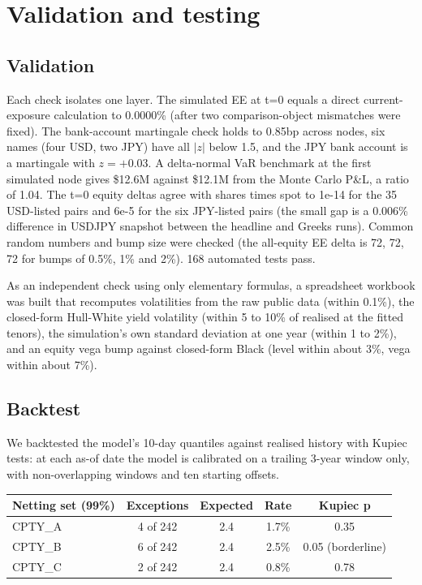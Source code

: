 \documentclass[11pt,letterpaper]{article}
\begin{document}
\section{Validation and testing}

\subsection{Validation}
Each check isolates one layer. The simulated EE at t=0 equals a direct current-exposure calculation to 0.0000\% (after two comparison-object mismatches were fixed). The bank-account martingale check holds to 0.85bp across nodes, six names (four USD, two JPY) have all $|z|$ below 1.5, and the JPY bank account is a martingale with $z=+0.03$. A delta-normal VaR benchmark at the first simulated node gives \$12.6M against \$12.1M from the Monte Carlo P\&L, a ratio of 1.04. The t=0 equity deltas agree with shares times spot to 1e-14 for the 35 USD-listed pairs and 6e-5 for the six JPY-listed pairs (the small gap is a 0.006\% difference in USDJPY snapshot between the headline and Greeks runs). Common random numbers and bump size were checked (the all-equity EE delta is 72, 72, 72 for bumps of 0.5\%, 1\% and 2\%). 168 automated tests pass.

As an independent check using only elementary formulas, a spreadsheet workbook was built that recomputes volatilities from the raw public data (within 0.1\%), the closed-form Hull-White yield volatility (within 5 to 10\% of realised at the fitted tenors), the simulation's own standard deviation at one year (within 1 to 2\%), and an equity vega bump against closed-form Black (level within about 3\%, vega within about 7\%).

\subsection{Backtest}
We backtested the model's 10-day quantiles against realised history with Kupiec tests: at each as-of date the model is calibrated on a trailing 3-year window only, with non-overlapping windows and ten starting offsets.

\begin{center}
\small
\begin{tabular}{@{}lcccc@{}}
\toprule
\textbf{Netting set (99\%)} & \textbf{Exceptions} & \textbf{Expected} & \textbf{Rate} & \textbf{Kupiec p}\\
\midrule
CPTY\_A & 4 of 242 & 2.4 & 1.7\% & 0.35\\
CPTY\_B & 6 of 242 & 2.4 & 2.5\% & 0.05 (borderline)\\
CPTY\_C & 2 of 242 & 2.4 & 0.8\% & 0.78\\
\bottomrule
\end{tabular}
\end{center}
\end{document}
